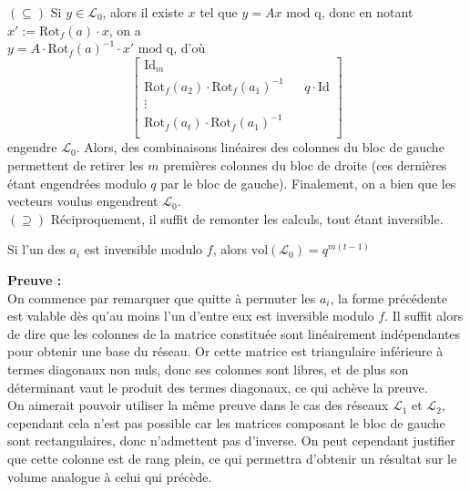 \documentclass[11pt,a4paper]{article}
\begin{document}
$(\subseteq)$ Si $y \in \mathcal{L}_0$, alors il existe $x$ tel que $y=Ax \text{ mod q}$, donc en notant $x':=\text{Rot}_f(a)\cdot x$, on a \\ $y=A\cdot\text{Rot}_f(a)^{-1}\cdot x' \text{ mod q}$, d'où 
$$ \left[\begin{array}{c|cccc}
\text{Id}_m \\
\text{Rot}_f(a_2)\cdot\text{Rot}_f(a_1)^{-1} & & q\cdot \text{Id}\\
\vdots &\\
\text{Rot}_f(a_t)\cdot\text{Rot}_f(a_1)^{-1}&\\
\end{array}\right] $$
engendre $\mathcal{L}_0$. Alors, des combinaisons linéaires des colonnes du bloc de gauche permettent de retirer les $m$ premières colonnes du bloc de droite (ces dernières étant engendrées modulo $q$ par le bloc de gauche). Finalement, on a bien que les vecteurs voulus engendrent $\mathcal{L}_0$. \\

$(\supseteq)$ Réciproquement, il suffit de remonter les calculs, tout étant inversible.

\begin{theorem}

Si l'un des $a_i$ est inversible modulo $f$, alors $\text{vol}(\mathcal{L}_0) = q^{m(t-1)}$
\end{theorem}
\textbf{Preuve :}\\
On commence par remarquer que quitte à permuter les $a_i$, la forme précédente est valable dès qu'au moins l'un d'entre eux est inversible modulo $f$. Il suffit alors de dire que les colonnes de la matrice constituée sont linéairement indépendantes pour obtenir une base du réseau. Or cette matrice est triangulaire inférieure à termes diagonaux non nuls, donc ses colonnes sont libres, et de plus son déterminant vaut le produit des termes diagonaux, ce qui achève la preuve. \\

On aimerait pouvoir utiliser la même preuve dans le cas des réseaux $\mathcal{L}_1$ et $\mathcal{L}_2$, cependant cela n'est pas possible car les matrices composant le bloc de gauche sont rectangulaires, donc n'admettent pas d'inverse. On peut cependant justifier que cette colonne est de rang plein, ce qui permettra d'obtenir un résultat sur le volume analogue à celui qui précède.
\end{document}
